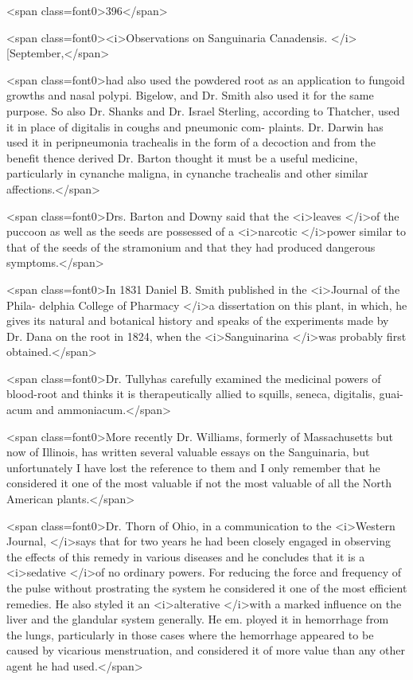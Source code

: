 <span class=font0>396</span>

<span class=font0><i>Observations on Sanguinaria Canadensis. </i>[September,</span>

<span class=font0>had also used the powdered root as an application to fungoid growths
and nasal polypi. Bigelow, and Dr. Smith also used it for the same
purpose. So also Dr. Shanks and Dr. Israel Sterling, according to
Thatcher, used it in place of digitalis in coughs and pneumonic com-
plaints. Dr. Darwin has used it in peripneumonia trachealis in the
form of a decoction and from the benefit thence derived Dr. Barton
thought it must be a useful medicine, particularly in cynanche maligna,
in cynanche trachealis and other similar affections.</span>

<span class=font0>Drs. Barton and Downy said that the <i>leaves </i>of the puccoon as well as
the seeds are possessed of a <i>narcotic </i>power similar to that of the seeds
of the stramonium and that they had produced dangerous symptoms.</span>

<span class=font0>In 1831 Daniel B. Smith published in the <i>Journal of the Phila-
delphia College of Pharmacy </i>a dissertation on this plant, in which,
he gives its natural and botanical history and speaks of the experiments
made by Dr. Dana on the root in 1824, when the <i>Sanguinarina </i>was
probably first obtained.</span>

<span class=font0>Dr. Tullyhas carefully examined the medicinal powers of blood-root
and thinks it is therapeutically allied to squills, seneca, digitalis, guai-
acum and ammoniacum.</span>

<span class=font0>More recently Dr. Williams, formerly of Massachusetts but now of
Illinois, has written several valuable essays on the Sanguinaria, but
unfortunately I have lost the reference to them and I only remember
that he considered it one of the most valuable if not the most valuable
of all the North American plants.</span>

<span class=font0>Dr. Thorn of Ohio, in a communication to the <i>Western Journal,
</i>says that for two years he had been closely engaged in observing the
effects of this remedy in various diseases and he concludes that it is a
<i>sedative </i>of no ordinary powers. For reducing the force and frequency
of the pulse without prostrating the system he considered it one of the
most efficient remedies. He also styled it an <i>alterative </i>with a marked
influence on the liver and the glandular system generally. He em.
ployed it in hemorrhage from the lungs, particularly in those cases where
the hemorrhage appeared to be caused by vicarious menstruation, and
considered it of more value than any other agent he had used.</span>

